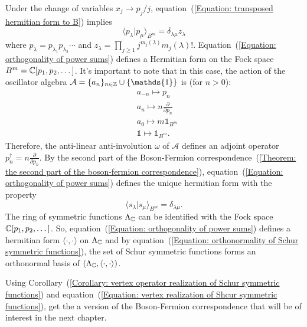 Under the change of variables $x_j\to p_j/j$, equation~(\ref{Equation: transposed hermitian form to B}) implies 
\begin{equation}\label{Equation: orthogonality of power sums}
    \langle p_\lambda|p_\mu\rangle_{B^m} = \delta_{\lambda\mu}z_\lambda
\end{equation}
where $p_\lambda=p_{\lambda_1}p_{\lambda_2}\cdots$ and $z_\lambda=\prod_{j\geq1}j^{m_j(\lambda)}m_j(\lambda)!$. Equation~(\ref{Equation: orthogonality of power sums}) defines a Hermitian form on the Fock space ${B^m}=\mathbb{C}[p_1,p_2,\dots]$. It's important to note that in this case, the action of the oscillator algebra $\mathcal{A}=\{a_n\}_{n\in\bb{Z}}\cup\{\mathds{1}\}$ is (for $n>0$):
\begin{equation}
    \begin{split}
        &a_{-n} \mapsto p_n\\
        &a_n\mapsto n\frac{\partial}{\partial p_n}\\
        &a_0\mapsto m\mathds{1}_{B^m}\\
        &\mathds{1}\mapsto \mathds{1}_{B^m}.
    \end{split}
\end{equation}
Therefore, the anti-linear anti-involution $\omega$ of $\mathcal{A}$ defines an adjoint operator $p_n^\dagger = n\frac{\partial}{\partial p_n}$. By the second part of the Boson-Fermion correspondence~(\ref{Theorem: the second part of the boson-fermion correspondence}), equation~(\ref{Equation: orthogonality of power sums}) defines the unique hermitian form with the property
\begin{equation}\label{Equation: orthonormality of Schur symmetric functions}
   \langle s_\lambda|s_\mu\rangle_{B^m} = \delta_{\lambda\mu}.
\end{equation}
The ring of symmetric functions $\Lambda_{\mathbb{C}}$ can be identified with the Fock space $\mathbb{C}[p_1,p_2,\dots]$. So, equation~(\ref{Equation: orthogonality of power sums}) defines a hermitian form $\langle\cdot,\cdot\rangle$ on $\Lambda_{\mathbb{C}}$ and by equation~(\ref{Equation: orthonormality of Schur symmetric functions}), the set of Schur symmetric functions forms an orthonormal basis of $(\Lambda_{\mathbb{C}}, \langle\cdot,\cdot\rangle)$.\par
Using Corollary~(\ref{Corollary: vertex operator realization of Schur symmetric functions}) and equation~(\ref{Equation: vertex realization of Shcur symmetric functions}), get the a version of the Boson-Fermion correspondence that will be of interest in the next chapter.
